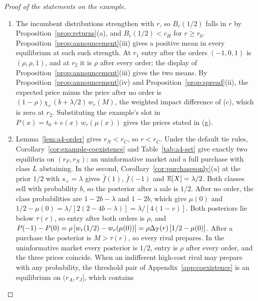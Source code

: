 \begin{proof}[Proof of the statements on the example]
\begin{enumerate}[label=(\alph*),leftmargin=2em]
\(D(y)=\1\{\ell\le y<h\}\), so \(D(r)-\Omega=\ell/r>0\) for \(\ell\le r<h\), the condition of
Proposition~\ref{prop:winner}(vi). On \((r_S,h)\) full two-sided trade holds with \(1/2<\tau(r)\) and \(\E[X]=0\), so
Proposition~\ref{prop:winner}(iii) and (iv) give \(\Cov(X,\1_{\rm prep})=(1-\rho)\chi_r(b+\lambda/2)\),
\(\Cov(X,\1_{\rm acq})=\rho\lambda\,\Omega/2+(1-\rho)\chi_r\,(b+\lambda/2)\,W_{F_r}(M)\), and the second difference
\((1-\rho)\chi_r\,W_{F_r}(M)\), with \(\chi_{r_1}=1\) and \(\chi_{r_2}=0\). Substituting the example's slot gives the
values stated in (f).
\item The incumbent distributions strengthen with \(r\), so \(B_r(1/2)\) falls in \(r\) by Proposition~\ref{prop:returns}(a),
and \(B_r(1/2)<c_H\) for \(r\ge r_0\). Proposition~\ref{prop:announcement}(iii) gives a positive mean in every
equilibrium at each such strength. At \(r_1\) entry after the orders \((-1,0,1)\) is \((\rho,\rho,1)\), and at \(r_2\) it is
\(\rho\) after every order; the display of Proposition~\ref{prop:announcement}(iii) gives the two means. By
Proposition~\ref{prop:announcement}(iv) and Proposition~\ref{prop:spread}(ii), the expected price minus the price after
no order is \((1-\rho)\chi_r\,(b+\lambda/2)\,w_r(M)\), the weighted impact difference of (c), which is zero at \(r_2\).
Substituting the example's slot in \(P(x)=t_0+e(x)\,w_r(\mu(x))\) gives the prices stated in (g).
\item Lemma~\ref{lem:a4-order} gives \(r_N<r_C\), so \(r<r_C\). Under the default tie rules,
Corollary~\ref{cor:example-coexistence} and Table~\ref{tab:a4-set} give exactly two equilibria on \((r_F,r_N)\): an uninformative
market and a full purchase with class \(L\) abstaining. In the second, Corollary~\ref{cor:purchasesonly}(a) at the prior
\(1/2\) with \(s_+=\lambda\) gives \(\bar f(1)\), \(\bar f(-1)\) and \(\mathbb{E}[X]=\lambda/2\). Both classes sell with
probability \(b\), so the posterior after a sale is \(1/2\). After no order, the class probabilities are \(1-2b-\lambda\)
and \(1-2b\), which give \(\mu(0)\) and
\(1/2-\mu(0)=\lambda/[2(2-4b-\lambda)]=\lambda/[4(1-v)]\). Both posteriors lie below \(\tau(r)\), so entry after both
orders is \(\rho\), and \(P(-1)-P(0)=\rho\,[w_r(1/2)-w_r(\mu(0))]=\rho\Delta_T(r)\,[1/2-\mu(0)]\). After a purchase the
posterior is \(M>\tau(r)\), so every rival prepares. In the uninformative market every posterior is \(1/2\), entry is \(\rho\)
after every order, and the three prices coincide. When an indifferent high-cost rival may prepare with any
probability, the threshold pair of Appendix~\ref{app:coexistence} is an equilibrium on \((r_A,r_J]\), which contains

\end{enumerate}
\end{proof}
